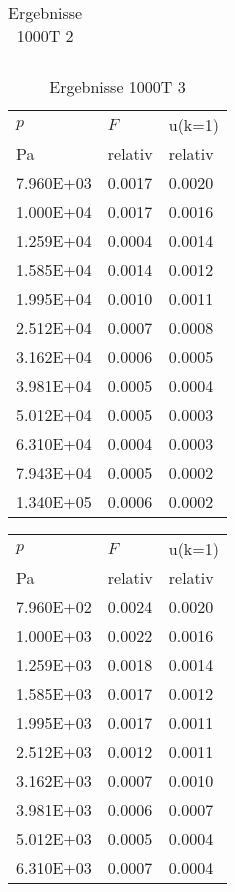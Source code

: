 \begin{table}
\begin{tabular}{l l l }
\bottomrule
\end{tabular}\caption{Ergebnisse 1000T 2}\end{table}\begin{table}\begin{tabular}{l l l }
\toprule
$p$&$F$&u(k=1)\\
 Pa & relativ & relativ\\\midrule
\num{7.960E+03}&\num{0.0017}&\num{0.0020}\\
\num{1.000E+04}&\num{0.0017}&\num{0.0016}\\
\num{1.259E+04}&\num{0.0004}&\num{0.0014}\\
\num{1.585E+04}&\num{0.0014}&\num{0.0012}\\
\num{1.995E+04}&\num{0.0010}&\num{0.0011}\\
\num{2.512E+04}&\num{0.0007}&\num{0.0008}\\
\num{3.162E+04}&\num{0.0006}&\num{0.0005}\\
\num{3.981E+04}&\num{0.0005}&\num{0.0004}\\
\num{5.012E+04}&\num{0.0005}&\num{0.0003}\\
\num{6.310E+04}&\num{0.0004}&\num{0.0003}\\
\num{7.943E+04}&\num{0.0005}&\num{0.0002}\\
\num{1.340E+05}&\num{0.0006}&\num{0.0002}\\
\bottomrule
\end{tabular}\caption{Ergebnisse 1000T 3}\end{table}\begin{table}\begin{tabular}{l l l }
\toprule
$p$&$F$&u(k=1)\\
 Pa & relativ & relativ\\\midrule
\num{7.960E+02}&\num{0.0024}&\num{0.0020}\\
\num{1.000E+03}&\num{0.0022}&\num{0.0016}\\
\num{1.259E+03}&\num{0.0018}&\num{0.0014}\\
\num{1.585E+03}&\num{0.0017}&\num{0.0012}\\
\num{1.995E+03}&\num{0.0017}&\num{0.0011}\\
\num{2.512E+03}&\num{0.0012}&\num{0.0011}\\
\num{3.162E+03}&\num{0.0007}&\num{0.0010}\\
\num{3.981E+03}&\num{0.0006}&\num{0.0007}\\
\num{5.012E+03}&\num{0.0005}&\num{0.0004}\\
\num{6.310E+03}&\num{0.0007}&\num{0.0004}\\

\end{tabular}
\end{table}
